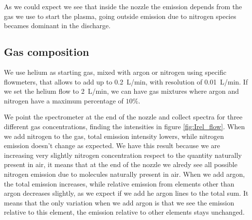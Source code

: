 As we could expect we see that inside the nozzle the emission depends from the gas we use to start the plasma, going outside emission due to nitrogen species becames dominant in the discharge.

\subsection{Gas composition}
We use helium as starting gas, mixed with argon or nitrogen using specific flowmeters, that allows to add up to \SI{0.2}{\liter/\minute}, with resolution of \SI{0.01}{\liter/\minute}.
If we set the helium flow to \SI{2}{\liter/\minute}, we can have gas mixtures where argon and nitrogen have a maximum percentage of $\num{10}\%$.

We point the spectrometer at the end of the nozzle and collect spectra for three different gas concentrations, finding the intensities in figure \ref{fig:Irel_flow}.
When we add nitrogen to the gas, total emission intensity lowers, while nitrogen emission doesn't change as expected. We have this result because we are increasing very slightly nitrogen concentration respect to the quantity naturally present in air, it means that at the end of the nozzle we alredy see all possible nitrogen emission due to molecules naturally present in air.
When we add argon, the total emission increases, while relative emission from elements other than argon decreases slightly, as we expect if we add he argon lines to the total sum. It means that the only variation when we add argon is that we see the emission relative to this element, the emission relative to other elements stays unchanged.
